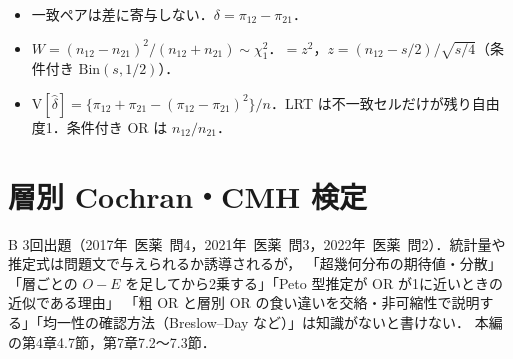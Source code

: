 \documentclass[a4paper,11pt,openany]{ltjsbook}
\newcommand{\kakomon}[2]{\mbox{#1年 医薬 問#2}}
\newcommand{\V}{\mathrm{V}}
\newcommand{\Bin}{\mathrm{Bin}}
\begin{document}
\begin{summarybox}
\begin{itemize}
\item 一致ペアは差に寄与しない．$\delta=\pi_{12}-\pi_{21}$．
\item $W=(n_{12}-n_{21})^2/(n_{12}+n_{21})\sim\chi^2_1$．$=z^2$，$z=(n_{12}-s/2)/\sqrt{s/4}$（条件付き $\Bin(s,1/2)$）．
\item $\V[\hat\delta]=\{\pi_{12}+\pi_{21}-(\pi_{12}-\pi_{21})^2\}/n$．LRT は不一致セルだけが残り自由度1．条件付き OR は $n_{12}/n_{21}$．
\end{itemize}
\end{summarybox}

\chapter{層別 Cochran・CMH 検定}\label{ch:m07}

\begin{priobox}{B}
3回出題（\kakomon{2017}{4}，\kakomon{2021}{3}，\kakomon{2022}{2}）．統計量や推定式は問題文で与えられるか誘導されるが，
「超幾何分布の期待値・分散」「層ごとの $O-E$ を足してから2乗する」「Peto 型推定が OR が1に近いときの近似である理由」
「粗 OR と層別 OR の食い違いを交絡・非可縮性で説明する」「均一性の確認方法（Breslow--Day など）」は知識がないと書けない．
本編の第4章4.7節，第7章7.2〜7.3節．
\end{priobox}

\end{document}
